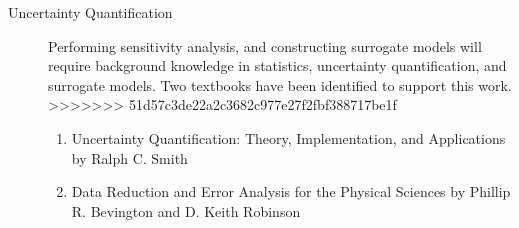 \documentclass{article}
\begin{document}
\begin{description}
\item[Uncertainty Quantification]
Performing sensitivity analysis, and constructing surrogate models 
will require background knowledge in statistics, %
uncertainty quantification, and surrogate models. Two textbooks have been identified to support this work.\\
>>>>>>> 51d57c3de22a2c3682c977e27f2fbf388717be1f
\begin{enumerate}
\item Uncertainty Quantification: Theory, Implementation, and Applications by Ralph C. Smith\\
\item Data Reduction and Error Analysis for the Physical Sciences by Phillip R. Bevington and D. Keith Robinson\\
\end{enumerate}
\end{description}

\end{document}
